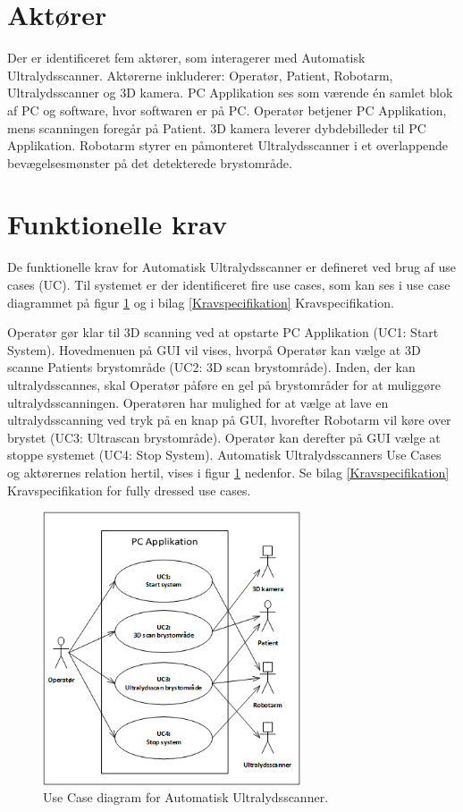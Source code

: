 \section{Aktører}
Der er identificeret fem aktører, som interagerer med Automatisk Ultralydsscanner. Aktørerne inkluderer: Operatør, Patient, Robotarm, Ultralydsscanner og 3D kamera. PC Applikation ses som værende én samlet blok af PC og software, hvor softwaren er på PC. Operatør betjener PC Applikation, mens scanningen foregår på Patient. 3D kamera leverer dybdebilleder til PC Applikation. Robotarm styrer en påmonteret Ultralydsscanner i et overlappende bevægelsesmønster på det detekterede brystområde.

\section{Funktionelle krav}
De funktionelle krav for Automatisk Ultralydsscanner er defineret ved brug af use cases (UC). Til systemet er der identificeret fire use cases, som kan ses i use case diagrammet på figur \ref{UseCaseDiagram} og i bilag \ref{Kravspecifikation} Kravspecifikation. 

Operatør gør klar til 3D scanning ved at opstarte PC Applikation (UC1: Start System). Hovedmenuen på GUI vil vises, hvorpå Operatør kan vælge at 3D scanne Patients brystområde (UC2: 3D scan brystområde). Inden, der kan ultralydsscannes, skal Operatør påføre en gel på brystområder for at muliggøre ultralydsscanningen. Operatøren har mulighed for at vælge at lave en ultralydsscanning ved tryk på en knap på GUI, hvorefter Robotarm vil køre over brystet (UC3: Ultrascan brystområde). Operatør kan derefter på GUI vælge at stoppe systemet (UC4: Stop System). Automatisk Ultralydsscanners Use Cases og aktørernes relation hertil, vises i figur \ref{UseCaseDiagram} nedenfor. Se bilag \ref{Kravspecifikation} Kravspecifikation for fully dressed use cases. 

\begin{figure}[H]
    \centering
    \includegraphics[width=0.68\textwidth]{figurer/d/Kravspecifikation/UseCaseDiagram}
    \caption{Use Case diagram for Automatisk Ultralydsscanner.}
    \label{UseCaseDiagram}
\end{figure}

